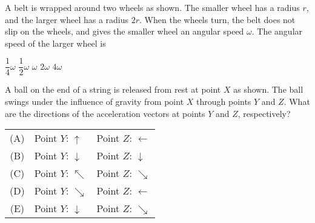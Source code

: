 \documentclass{../../../oss-classkick-exam}
\begin{document}
\begin{multicols*}{2}
\begin{questions}
    
  \question A belt is wrapped around two wheels as shown. The smaller wheel has
    a radius $r$, and the larger wheel has a radius $2r$. When the wheels turn,
    the belt does not slip on the wheels, and gives the smaller wheel an
    angular speed $\omega$. The angular speed of the larger wheel is
    \begin{choices}
      \choice $\dfrac14\omega$
      \choice $\dfrac12\omega$
      \choice $\omega$
      \choice $2\omega$
      \choice $4\omega$
    \end{choices}
    \columnbreak


  \question A ball on the end of a string is released from rest at point $X$ as
    shown. The ball swings under the influence of gravity from point $X$ through
    points $Y$ and $Z$. What are the directions of the acceleration vectors at
    points $Y$ and $Z$, respectively?
    \begin{tabular}{cll}
      (A) & Point $Y$: {\LARGE $\uparrow$} & Point $Z$: {\LARGE $\leftarrow$}\\
      (B) & Point $Y$: {\LARGE $\downarrow$}& Point $Z$: {\LARGE $\downarrow$}\\
      (C) & Point $Y$: {\LARGE $\nwarrow$} & Point $Z$: {\LARGE $\searrow$}\\
      (D) & Point $Y$: {\LARGE $\searrow$} & Point $Z$: {\LARGE $\leftarrow$}\\
      (E) & Point $Y$: {\LARGE $\downarrow$} & Point $Z$: {\LARGE $\searrow$}\\
    \end{tabular}
    \vspace{.7in}
    

\end{questions}
\end{multicols*}
\end{document}
